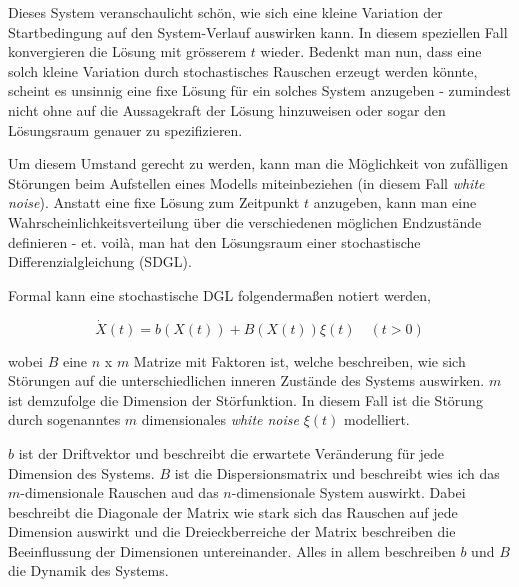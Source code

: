 Dieses System veranschaulicht schön, wie sich eine kleine Variation der Startbedingung auf den System-Verlauf auswirken kann. In diesem speziellen Fall konvergieren die Lösung mit grösserem $t$ wieder. Bedenkt man nun, dass eine solch kleine Variation durch stochastisches Rauschen erzeugt werden könnte, scheint es unsinnig eine fixe Lösung für ein solches System anzugeben - zumindest nicht ohne auf die Aussagekraft der Lösung hinzuweisen oder sogar den Lösungsraum genauer zu spezifizieren.


Um diesem Umstand gerecht zu werden, kann man die Möglichkeit von zufälligen Störungen beim Aufstellen eines Modells miteinbeziehen (in diesem Fall \textit{white noise}). Anstatt eine fixe Lösung zum Zeitpunkt $ t $ anzugeben, kann man eine Wahrscheinlichkeitsverteilung über die verschiedenen möglichen Endzustände definieren - et. voilà, man hat den Lösungsraum einer stochastische Differenzialgleichung (SDGL).

Formal kann eine stochastische DGL folgendermaßen notiert werden, 

\begin{equation}
\label{brown:SDGL:whiteNoise}
\dot{X}(t) = b(X(t)) + B(X(t))\xi(t) \quad (t>0)
\end{equation}

wobei $ B $ eine $ n $ x $ m $ Matrize mit Faktoren ist, welche beschreiben, wie sich Störungen auf die unterschiedlichen inneren Zustände des Systems auswirken. $ m $ ist demzufolge die Dimension der Störfunktion. In diesem Fall ist die Störung durch sogenanntes $ m $ dimensionales \textit{white noise} $ \xi(t) $ modelliert.

$ b $ ist der Driftvektor und beschreibt die erwartete Veränderung für jede Dimension des Systems. $ B $ ist die Dispersionsmatrix und beschreibt wies ich das $m$-dimensionale Rauschen aud das $n$-dimensionale System auswirkt. Dabei beschreibt die Diagonale der Matrix wie stark sich das Rauschen auf jede Dimension auswirkt und die Dreieckberreiche der Matrix beschreiben die Beeinflussung der Dimensionen untereinander. Alles in allem beschreiben $ b $ und $ B $ die Dynamik des Systems. 

